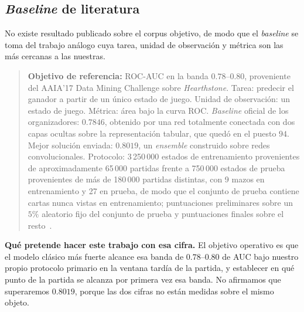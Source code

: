 \documentclass[conference]{IEEEtran}
\begin{document}
\subsection{\emph{Baseline} de literatura}
\label{subsec:litbaseline}

No existe resultado publicado sobre el corpus objetivo, de modo que el
\emph{baseline} se toma del trabajo an\'alogo cuya tarea, unidad de
observaci\'on y m\'etrica son las m\'as cercanas a las nuestras.

\begin{quote}
\textbf{Objetivo de referencia:} ROC-AUC en la banda $0.78$--$0.80$,
proveniente del AAIA'17 Data Mining Challenge sobre \emph{Hearthstone}.
Tarea: predecir el ganador a partir de un \'unico estado de juego. Unidad de
observaci\'on: un estado de juego. M\'etrica: \'area bajo la curva ROC.
\emph{Baseline} oficial de los organizadores: $0.7846$, obtenido por una red
totalmente conectada con dos capas ocultas sobre la representaci\'on
tabular, que qued\'o en el puesto $94$. Mejor soluci\'on enviada: $0.8019$,
un \emph{ensemble} construido sobre redes convolucionales. Protocolo:
3\,250\,000 estados de entrenamiento provenientes de aproximadamente
65\,000 partidas frente a 750\,000 estados de prueba provenientes de m\'as
de 180\,000 partidas distintas, con 9 mazos en entrenamiento y 27 en prueba,
de modo que el conjunto de prueba contiene cartas nunca vistas en
entrenamiento; puntuaciones preliminares sobre un $5\%$ aleatorio fijo del
conjunto de prueba y puntuaciones finales sobre el
resto~\cite{janusz_hearthstone_2017}.
\end{quote}

\noindent\textbf{Qu\'e pretende hacer este trabajo con esa cifra.} El
objetivo operativo es que el modelo cl\'asico m\'as fuerte alcance esa banda
de $0.78$--$0.80$ de AUC bajo nuestro propio protocolo primario en la
ventana tard\'ia de la partida, y establecer en qu\'e punto de la partida se
alcanza por primera vez esa banda. No afirmamos que superaremos $0.8019$,
porque las dos cifras no est\'an medidas sobre el mismo objeto.
\end{document}
